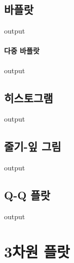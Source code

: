 \documentclass{report}
\begin{document}
\subsection{바플랏}
\begin{Schunk}
\begin{Soutput}
output
\end{Soutput}
\end{Schunk}
\paragraph{다중 바플랏}
\begin{Schunk}
\begin{Soutput}
output
\end{Soutput}
\end{Schunk}
\subsection{히스토그램}
\begin{Schunk}
\begin{Soutput}
output
\end{Soutput}
\end{Schunk}
\subsection{줄기-잎 그림}
\begin{Schunk}
\begin{Soutput}
output
\end{Soutput}
\end{Schunk}
\subsection{Q-Q 플랏}
\begin{Schunk}
\begin{Soutput}
output
\end{Soutput}
\end{Schunk}

\section{3차원 플랏}
\end{document}
